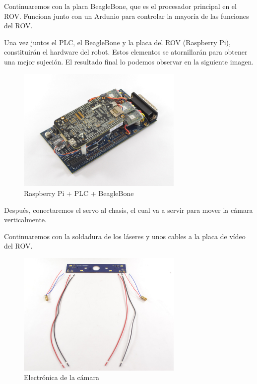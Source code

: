 Continuaremos con la placa BeagleBone, que es el procesador principal en el ROV. Funciona junto con un Ardunio para controlar la mayoría de las funciones del ROV.

Una vez juntos el PLC, el BeagleBone y la placa del ROV (Raspberry Pi), constituirán el hardware del robot. Estos elementos se atornillarán para obtener una mejor sujeción. El resultado final lo podemos observar en la siguiente imagen.
\newpage
\begin{figure} [hbtp]
  \begin{center}
    \includegraphics[width=8cm]{img/cap3/3_3/electronica}
  \end{center}
  \caption{Raspberry Pi + PLC + BeagleBone}
  \label{fig:electronica}
\end{figure}

Después, conectaremos el servo al chasis, el cual va a servir para mover la cámara verticalmente.

Continuaremos con la soldadura de los láseres y unos cables a la placa de vídeo del ROV.

\begin{figure} [hbtp]
  \begin{center}
    \includegraphics[width=8cm]{img/cap3/3_3/electronica_camara}
  \end{center}
  \caption{Electrónica de la cámara}
  \label{fig:electronica_camara}
\end{figure}

